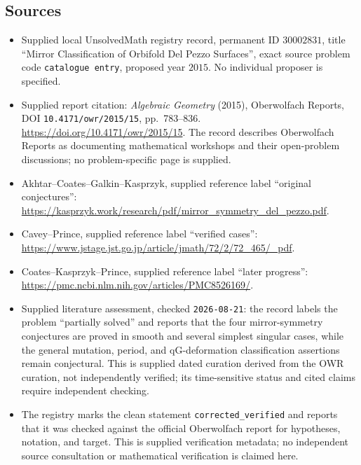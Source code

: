 \documentclass[11pt]{article}
\begin{document}
\subsection{Sources}
\begin{itemize}
\item Supplied local UnsolvedMath registry record, permanent ID \(30002831\), title ``Mirror Classification of Orbifold Del Pezzo Surfaces'', exact source problem code \texttt{catalogue entry}, proposed year \(2015\). No individual proposer is specified.
\item Supplied report citation: \emph{Algebraic Geometry} (2015), Oberwolfach Reports, DOI \texttt{10.4171/owr/2015/15}, pp.~783--836. \url{https://doi.org/10.4171/owr/2015/15}. The record describes Oberwolfach Reports as documenting mathematical workshops and their open-problem discussions; no problem-specific page is supplied.
\item Akhtar--Coates--Galkin--Kasprzyk, supplied reference label ``original conjectures'': \url{https://kasprzyk.work/research/pdf/mirror_symmetry_del_pezzo.pdf}.
\item Cavey--Prince, supplied reference label ``verified cases'': \url{https://www.jstage.jst.go.jp/article/jmath/72/2/72_465/_pdf}.
\item Coates--Kasprzyk--Prince, supplied reference label ``later progress'': \url{https://pmc.ncbi.nlm.nih.gov/articles/PMC8526169/}.
\item Supplied literature assessment, checked \texttt{2026-08-21}: the record labels the problem ``partially solved'' and reports that the four mirror-symmetry conjectures are proved in smooth and several simplest singular cases, while the general mutation, period, and qG-deformation classification assertions remain conjectural. This is supplied dated curation derived from the OWR curation, not independently verified; its time-sensitive status and cited claims require independent checking.
\item The registry marks the clean statement \texttt{corrected\_verified} and reports that it was checked against the official Oberwolfach report for hypotheses, notation, and target. This is supplied verification metadata; no independent source consultation or mathematical verification is claimed here.
\end{itemize}
\end{document}

